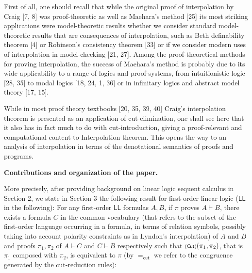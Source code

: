 \documentclass[10pt,a4paper]{article}
\begin{document}
 
 
First of all, one should recall that while the original proof of interpolation by Craig [7, 8] was proof-theoretic as well as Maehara’s method [25] its most striking applications were model-theoretic results whether we consider standard model-theoretic results that are consequences of interpolation, such as Beth definability theorem [4] or Robinson’s consistency theorem [33] or if we consider modern uses of interpolation in model-checking [21, 27]. Among the proof-theoretical methods for proving interpolation, the success of Maehara’s method is probably due to its wide applicability to a range of logics and proof-systems, from intuitionistic logic [28, 35] to modal logics [18, 24, 1, 36] or in infinitary logics and abstract model theory [17, 15].\par
 
 
 
While in most proof theory textbooks [20, 35, 39, 40] Craig’s interpolation theorem is presented as an application of cut-elimination, one shall see here that it also has in fact much to do with cut-introduction, giving a proof-relevant and computational content to Interpolation theorem. This opens the way to an analysis of interpolation in terms of the denotational semantics of proofs and programs.\par
 
 
 
\par\medskip\noindent\textbf{Contributions and organization of the paper.}\par
 
 
More precisely, after providing background on linear logic sequent calculus in Section 2, we state in Section 3 the following result for first-order linear logic ($\mathsf{LL}$ in the following): For any first-order $\mathsf{LL}$ formulas $A,B$, if $\pi$ proves $A\vdash B$, there exists a formula $C$ in the common vocabulary (that refers to the subset of the first-order language occurring in a formula, in terms of relation symbols, possibly taking into account polarity constraints as in Lyndon’s interpolation) of $A$ and $B$ and proofs $\pi_{1},\pi_{2}$ of $A\vdash C$ and $C\vdash B$ respectively such that ${\text{\scriptsize$(\mathsf{Cut})$}}(\pi_{1},\pi_{2})$, that is $\pi_{1}$ composed with $\pi_{2}$, is equivalent to $\pi$ (by $=_{\mathsf{cut}}$ we refer to the congruence generated by the cut-reduction rules):\par
 
\end{document}
